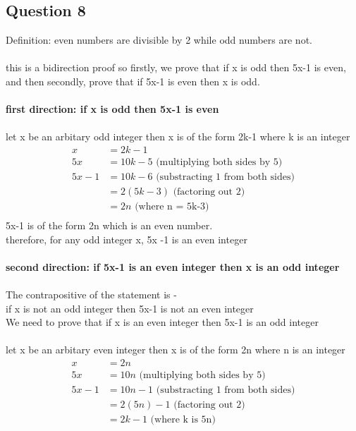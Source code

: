 \documentclass[11pt]{article}
\begin{document}
{{{\subsection*{Question 8}
Definition: even numbers are divisible by 2 while odd numbers are not. \\ \\
this is a bidirection proof so firstly, we prove that if x is odd
then 5x-1 is even, \\
and then secondly, prove that if 5x-1 is even then x is odd. \\
\\
\textbf{first direction: if x is odd then 5x-1 is even} \\
\\
let x be an arbitary odd integer then x is of the form 2k-1
where k is an integer \\
\begin{align*}
    x &= 2k-1 \\
    5x &= 10k - 5 \text{  (multiplying both sides by 5)} \\
    5x - 1 &= 10k - 6 \text{  (substracting 1 from both sides)} \\
    &=2(5k - 3) \text{  (factoring out 2)} \\
    &=2n \text{  (where n = 5k-3)} \\
\end{align*}
5x-1 is of the form 2n which is an even number.\\
therefore, for any odd integer x, 5x -1 is an even integer
\\ \\
\textbf{second direction: if 5x-1 is an even integer then x is an odd integer} \\
\\
The contrapositive of the statement is - \\
if x is not an odd integer then 5x-1 is not an even integer \\
We need to prove that
if x is an even integer then 5x-1 is an odd integer \\
\\
let x be an arbitary even integer then x is of the form 2n
where n is an integer \\
\begin{align*}
    x &= 2n \\
    5x &= 10n \text{  (multiplying both sides by 5)} \\
    5x - 1 &= 10n - 1 \text{  (substracting 1 from both sides)}  \\
    &= 2(5n)  - 1 \text{  (factoring out 2)} \\
    &= 2k - 1 \text{  (where k is 5n)}
\end{align*}

}}}
\end{document}
